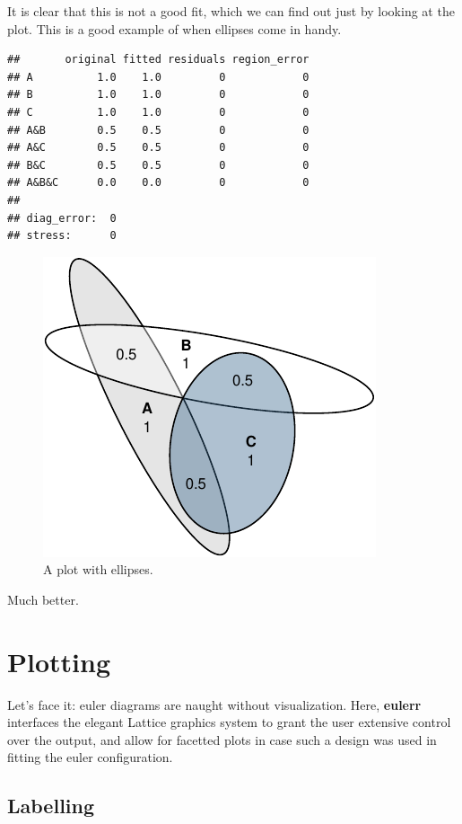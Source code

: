 \documentclass[
  headsepline=true,headings=standardclasses%
]{scrartcl}
\theoremstyle{definition}
\theoremstyle{definition}
\theoremstyle{definition}
\theoremstyle{remark}
\begin{document}
It is clear that this is not a good fit, which we can find out just by
looking at the plot. This is a good example of when ellipses come in
handy.

\begin{verbatim}
##       original fitted residuals region_error
## A          1.0    1.0         0            0
## B          1.0    1.0         0            0
## C          1.0    1.0         0            0
## A&B        0.5    0.5         0            0
## A&C        0.5    0.5         0            0
## B&C        0.5    0.5         0            0
## A&B&C      0.0    0.0         0            0
## 
## diag_error:  0 
## stress:      0
\end{verbatim}

\begin{figure}
\centering
\includegraphics{thesis_files/figure-latex/unnamed-chunk-4-1.pdf}
\caption{\label{fig:unnamed-chunk-4}A plot with ellipses.}
\end{figure}

Much better.

\section{Plotting}\label{plotting}

Let's face it: euler diagrams are naught without visualization. Here,
\textbf{eulerr} interfaces the elegant Lattice graphics system
\autocite{sarkar_2008} to grant the user extensive control over the
output, and allow for facetted plots in case such a design was used in
fitting the euler configuration.

\subsection{Labelling}\label{labelling}
\end{document}
